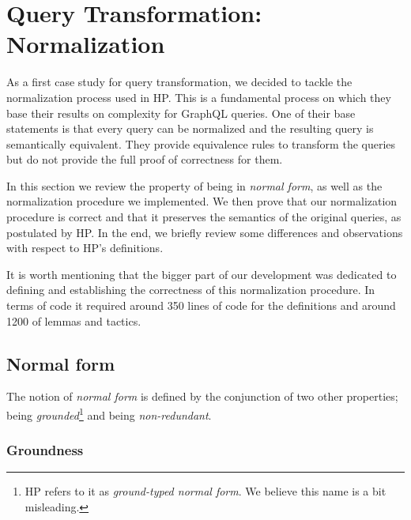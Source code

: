 
\section{Query Transformation: Normalization}\label{sec:norm}

As a first case study for query transformation, we decided to tackle the normalization process used in HP. This is a fundamental process on which they base their results on complexity for GraphQL queries. One of their base statements is that every query can be normalized and the resulting query is semantically equivalent. They provide equivalence rules to transform the queries but do not provide the full proof of correctness for them.

In this section we review the property of being in \textit{normal form}, as well as the normalization procedure we implemented. We then prove that our normalization procedure is correct and that it preserves the semantics of the original queries, as postulated by HP. In the end, we briefly review some differences and observations with respect to HP's definitions.

It is worth mentioning that the bigger part of our development was dedicated to defining and establishing the correctness of this normalization procedure. In terms of code it required around 350 lines of code for the definitions and around 1200 of lemmas and tactics.

\subsection{Normal form}

The notion of \textit{normal form} is defined by the conjunction of two other properties; being \textit{grounded}\footnote{HP refers to it as \textit{ground-typed normal form}. We believe this name is a bit misleading.} and being \textit{non-redundant}.


\subsubsection*{Groundness}

